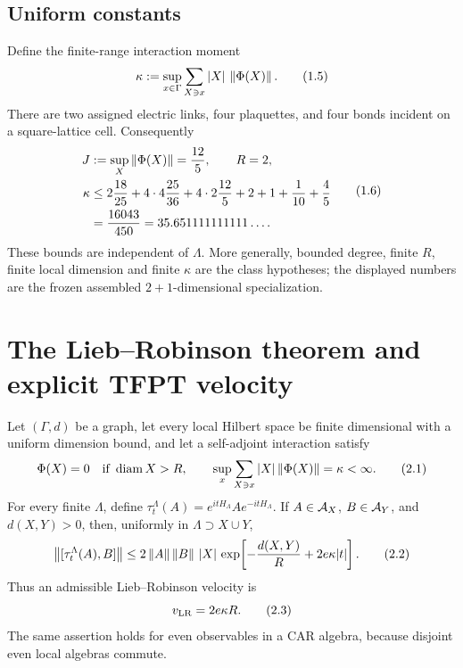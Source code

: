 \subsection{Uniform constants}

Define the finite-range interaction moment
\[
 \kappa:=\sup_{x\in\Gamma}
 \sum_{X\ni x}|X|\,\left\lVert\Phi(X)\right\rVert.
\tag{1.5}\label{eq:kappa}
\]
There are two assigned electric links, four plaquettes, and four bonds
incident on a square-lattice cell.  Consequently
\[
\begin{aligned}
 J&:=\sup_X\left\lVert\Phi(X)\right\rVert=\frac{12}{5},\qquad R=2,\\
 \kappa
 &\leq
 2\frac{18}{25}
 +4\cdot4\frac{25}{36}
 +4\cdot2\frac{12}{5}
 +2+1+\frac1{10}+\frac45\\
 &=\frac{16043}{450}=35.651111111111\ldots .
\end{aligned}
\tag{1.6}\label{eq:constants}
\]
These bounds are independent of \(\Lambda\).  More generally, bounded
degree, finite \(R\), finite local dimension and finite \(\kappa\) are the
class hypotheses; the displayed numbers are the frozen assembled
\(2+1\)-dimensional specialization.

\section{The Lieb--Robinson theorem and explicit TFPT velocity}

\begin{theorem}
\label{thm:LRclassical}
Let \((\Gamma,d)\) be a graph, let every local Hilbert space be finite
dimensional with a uniform dimension bound, and let a self-adjoint
interaction satisfy
\[
 \Phi(X)=0\quad\text{if }\operatorname{diam} X>R,\qquad
 \sup_x\sum_{X\ni x}|X|\left\lVert\Phi(X)\right\rVert=\kappa<\infty.
\tag{2.1}\label{eq:LRhyp}
\]
For every finite \(\Lambda\), define
\(\tau_t^\Lambda(A)=e^{itH_\Lambda}Ae^{-itH_\Lambda}\).
If \(A\in\mathcal A_X\), \(B\in\mathcal A_Y\), and \(d(X,Y)>0\), then, uniformly in
\(\Lambda\supset X\cup Y\),
\[
 \left\lVert[\tau_t^\Lambda(A),B]\right\rVert
 \leq
 2\left\lVert A\right\rVert\left\lVert B\right\rVert\,|X|\,
 \exp\!\left[-\frac{d(X,Y)}R+2e\kappa|t|\right].
\tag{2.2}\label{eq:LR}
\]
Thus an admissible Lieb--Robinson velocity is
\[
 v_{\rm LR}=2e\kappa R.
\tag{2.3}\label{eq:vLR}
\]
The same assertion holds for even observables in a CAR algebra, because
disjoint even local algebras commute.
\end{theorem}

